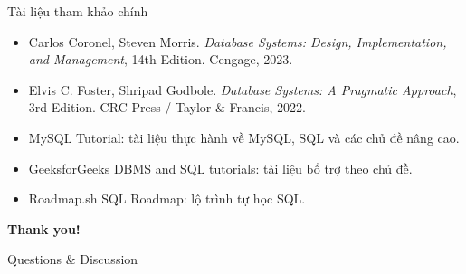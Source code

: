 \documentclass[aspectratio=169,11pt]{beamer}
\begin{document}
\begin{frame}{Tài liệu tham khảo chính}
\begin{itemize}
  \item Carlos Coronel, Steven Morris. \textit{Database Systems: Design, Implementation, and Management}, 14th Edition. Cengage, 2023.
  \item Elvis C. Foster, Shripad Godbole. \textit{Database Systems: A Pragmatic Approach}, 3rd Edition. CRC Press / Taylor \& Francis, 2022.
  \item MySQL Tutorial: tài liệu thực hành về MySQL, SQL và các chủ đề nâng cao.
  \item GeeksforGeeks DBMS and SQL tutorials: tài liệu bổ trợ theo chủ đề.
  \item Roadmap.sh SQL Roadmap: lộ trình tự học SQL.
\end{itemize}
\end{frame}

\begin{frame}
\centering
\Huge \textbf{Thank you!}

\vspace{1em}
\Large Questions \& Discussion
\end{frame}
\end{document}
